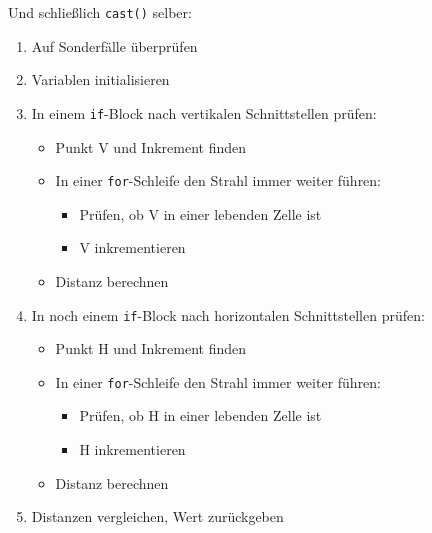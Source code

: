 \documentclass[a4paper,12pt]{report}
\begin{document}
Und schließlich \texttt{cast()} selber:
\begin{spacing}{1.0}
\begin{framed}
\begin{enumerate}
	\item Auf Sonderfälle überprüfen
	\item Variablen initialisieren
	\item In einem \texttt{if}-Block nach vertikalen Schnittstellen prüfen:
	\begin{itemize}
		\item Punkt V und Inkrement finden
		\item In einer \texttt{for}-Schleife den Strahl immer weiter führen:
		\begin{itemize}
			\item Prüfen, ob V in einer lebenden Zelle ist
			\item V inkrementieren
		\end{itemize}
		\item Distanz berechnen
	\end{itemize}
	\item In noch einem \texttt{if}-Block nach horizontalen Schnittstellen prüfen:
	\begin{itemize}
		\item Punkt H und Inkrement finden
		\item In einer \texttt{for}-Schleife den Strahl immer weiter führen:
		\begin{itemize}
			\item Prüfen, ob H in einer lebenden Zelle ist
			\item H inkrementieren
		\end{itemize}
		\item Distanz berechnen
	\end{itemize}
	\item Distanzen vergleichen, Wert zurückgeben
\end{enumerate}
\end{framed}
\end{spacing}
\end{document}
